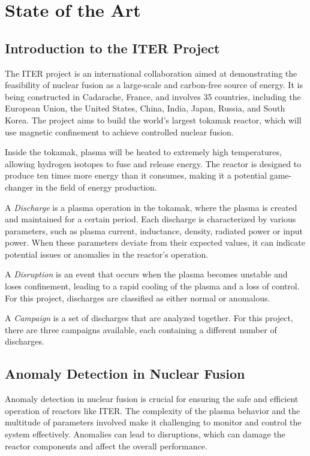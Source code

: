 \chapter{State of the Art} \label{sec:cap2}

\section{Introduction to the \acs{ITER} Project}

The \ac{ITER} project is an international collaboration aimed at demonstrating the feasibility of nuclear fusion as a large-scale and carbon-free source of energy. It is being constructed in Cadarache, France, and involves 35 countries, including the European Union, the United States, China, India, Japan, Russia, and South Korea. The project aims to build the world's largest tokamak reactor, which will use magnetic confinement to achieve controlled nuclear fusion.

Inside the tokamak, plasma will be heated to extremely high temperatures, allowing hydrogen isotopes to fuse and release energy. The reactor is designed to produce ten times more energy than it consumes, making it a potential game-changer in the field of energy production.

A \textit{Discharge} is a plasma operation in the tokamak, where the plasma is created and maintained for a certain period. Each discharge is characterized by various parameters, such as plasma current, inductance, density, radiated power or input power. When these parameters deviate from their expected values, it can indicate potential issues or anomalies in the reactor's operation.

A \textit{Disruption} is an event that occurs when the plasma becomes unstable and loses confinement, leading to a rapid cooling of the plasma and a loss of control. For this project, discharges are classified as either normal or anomalous.

A \textit{Campaign} is a set of discharges that are analyzed together. For this project, there are three campaigns available, each containing a different number of discharges.

\section{Anomaly Detection in Nuclear Fusion}

Anomaly detection in nuclear fusion is crucial for ensuring the safe and efficient operation of reactors like \ac{ITER}. The complexity of the plasma behavior and the multitude of parameters involved make it challenging to monitor and control the system effectively. Anomalies can lead to disruptions, which can damage the reactor components and affect the overall performance.


